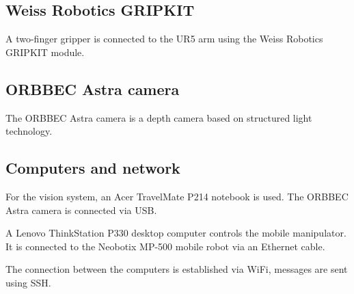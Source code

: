\subsection{Weiss Robotics GRIPKIT}

A two-finger gripper is connected to the UR5 arm using the Weiss Robotics GRIPKIT module.\par

\subsection{ORBBEC Astra camera}
The ORBBEC Astra camera is a depth camera based on structured light technology.\par

\subsection{Computers and network}
For the vision system, an Acer TravelMate P214 notebook is used. The ORBBEC Astra camera is connected via USB.\par
A Lenovo ThinkStation P330 desktop computer controls the mobile manipulator. It is connected to the Neobotix MP-500 mobile robot via an Ethernet cable.\par
The connection between the computers is established via WiFi, messages are sent using SSH.\par
